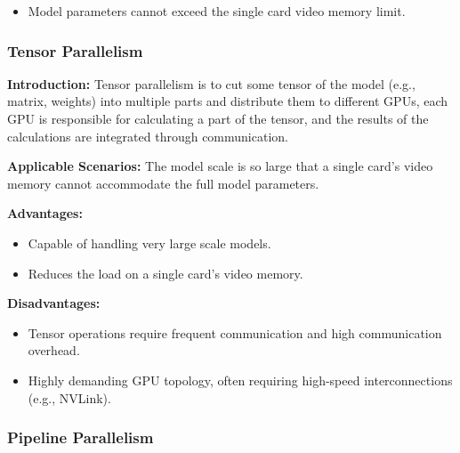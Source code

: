 \documentclass{article}
\begin{document}
    \begin{itemize}
        
            \item Model parameters cannot exceed the single card video memory limit.
        \end{itemize}

\subsubsection{Tensor Parallelism}
\hspace{2em}

\textbf{Introduction:} Tensor parallelism is to cut some tensor of the model (e.g., matrix, weights) into multiple parts and distribute them to different GPUs, each GPU is responsible for calculating a part of the tensor, and the results of the calculations are integrated through communication.

\textbf{Applicable Scenarios:} The model scale is so large that a single card's video memory cannot accommodate the full model parameters.

\textbf{Advantages:} 
    \begin{itemize}
            \item Capable of handling very large scale models.
        \end{itemize}
    
    \begin{itemize}
        
            \item Reduces the load on a single card's video memory.
        \end{itemize}

\textbf{Disadvantages:} 
\begin{itemize}
       
            \item Tensor operations require frequent communication and high communication overhead.
        \end{itemize}
    
    \begin{itemize}
        
            \item Highly demanding GPU topology, often requiring high-speed interconnections (e.g., NVLink).
        \end{itemize}

\subsubsection{Pipeline Parallelism}
\hspace{2em}
\end{document}
